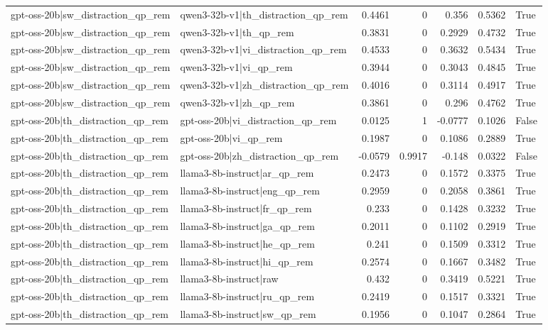 \begin{table}
\begin{tabular}{l l r r r r l}
gpt-oss-20b|sw_distraction_qp_rem & qwen3-32b-v1|th_distraction_qp_rem & 0.4461 & 0 & 0.356 & 0.5362 & True \\
gpt-oss-20b|sw_distraction_qp_rem & qwen3-32b-v1|th_qp_rem & 0.3831 & 0 & 0.2929 & 0.4732 & True \\
gpt-oss-20b|sw_distraction_qp_rem & qwen3-32b-v1|vi_distraction_qp_rem & 0.4533 & 0 & 0.3632 & 0.5434 & True \\
gpt-oss-20b|sw_distraction_qp_rem & qwen3-32b-v1|vi_qp_rem & 0.3944 & 0 & 0.3043 & 0.4845 & True \\
gpt-oss-20b|sw_distraction_qp_rem & qwen3-32b-v1|zh_distraction_qp_rem & 0.4016 & 0 & 0.3114 & 0.4917 & True \\
gpt-oss-20b|sw_distraction_qp_rem & qwen3-32b-v1|zh_qp_rem & 0.3861 & 0 & 0.296 & 0.4762 & True \\
gpt-oss-20b|th_distraction_qp_rem & gpt-oss-20b|vi_distraction_qp_rem & 0.0125 & 1 & -0.0777 & 0.1026 & False \\
gpt-oss-20b|th_distraction_qp_rem & gpt-oss-20b|vi_qp_rem & 0.1987 & 0 & 0.1086 & 0.2889 & True \\
gpt-oss-20b|th_distraction_qp_rem & gpt-oss-20b|zh_distraction_qp_rem & -0.0579 & 0.9917 & -0.148 & 0.0322 & False \\
gpt-oss-20b|th_distraction_qp_rem & llama3-8b-instruct|ar_qp_rem & 0.2473 & 0 & 0.1572 & 0.3375 & True \\
gpt-oss-20b|th_distraction_qp_rem & llama3-8b-instruct|eng_qp_rem & 0.2959 & 0 & 0.2058 & 0.3861 & True \\
gpt-oss-20b|th_distraction_qp_rem & llama3-8b-instruct|fr_qp_rem & 0.233 & 0 & 0.1428 & 0.3232 & True \\
gpt-oss-20b|th_distraction_qp_rem & llama3-8b-instruct|ga_qp_rem & 0.2011 & 0 & 0.1102 & 0.2919 & True \\
gpt-oss-20b|th_distraction_qp_rem & llama3-8b-instruct|he_qp_rem & 0.241 & 0 & 0.1509 & 0.3312 & True \\
gpt-oss-20b|th_distraction_qp_rem & llama3-8b-instruct|hi_qp_rem & 0.2574 & 0 & 0.1667 & 0.3482 & True \\
gpt-oss-20b|th_distraction_qp_rem & llama3-8b-instruct|raw & 0.432 & 0 & 0.3419 & 0.5221 & True \\
gpt-oss-20b|th_distraction_qp_rem & llama3-8b-instruct|ru_qp_rem & 0.2419 & 0 & 0.1517 & 0.3321 & True \\
gpt-oss-20b|th_distraction_qp_rem & llama3-8b-instruct|sw_qp_rem & 0.1956 & 0 & 0.1047 & 0.2864 & True \\

\end{tabular}
\end{table}
